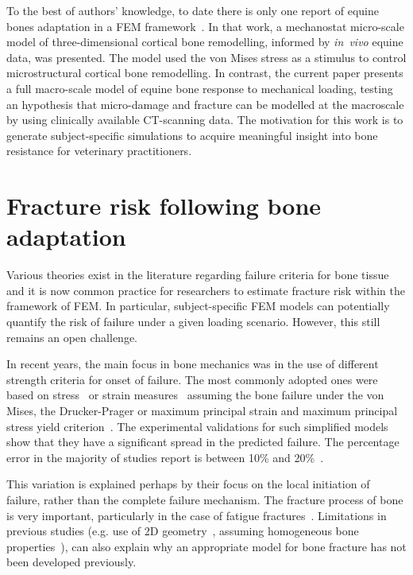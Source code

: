 \documentclass[11pt]{acmeArticle}
\numberwithin{equation}{section}
\begin{document}
To the best of authors' knowledge, to date there is only one report of equine bones adaptation in a FEM framework~\citep{Wang2016}. 
In that work, a mechanostat micro-scale model of three-dimensional cortical bone remodelling, informed by \emph{in~vivo} equine data, was presented. 
The model used the von Mises stress as a stimulus to control microstructural cortical bone remodelling.
In contrast, the current paper presents a full macro-scale model of equine bone response to mechanical loading, testing an hypothesis that micro-damage and fracture can be modelled at the macroscale by using clinically available CT-scanning data.
The motivation for this work is to generate subject-specific simulations to acquire meaningful insight into bone resistance
 for veterinary practitioners.

\section{Fracture risk following bone adaptation}\label{sec:release_energy}
Various theories exist in the literature regarding failure criteria for bone tissue and it is now common practice for researchers to estimate fracture risk within the framework of FEM. In particular, subject-specific FEM models can potentially quantify the risk of failure under a given loading scenario. However, this still remains an open challenge.

In recent years, the main focus in bone mechanics was in the use of different strength criteria for onset of failure. 
The most commonly adopted ones were based on stress~\citep{keyak2005predicting} or strain measures~\citep{schileo2008subject} assuming the bone failure under the von Mises, the Drucker-Prager or maximum principal strain and maximum principal stress yield criterion~\citep{yosibash2010predicting}. 
The experimental validations for such simplified models show that they have a significant spread in the predicted failure. 
The percentage error in the majority of studies report is between 10\% and 20\%~\citep{van2014accurately}.

This variation is explained perhaps by their focus on the local initiation of failure, rather than the complete failure mechanism. 
The fracture process of bone is very important,  particularly in the case of fatigue fractures~\citep{gupta2008fracture}. 
Limitations in previous studies (e.g. use of 2D geometry~\citep{bettamer2017using}, assuming homogeneous bone properties~\citep{gasser2007numerical}), 
can also explain why an appropriate model for bone fracture has not been developed previously.
\end{document}
